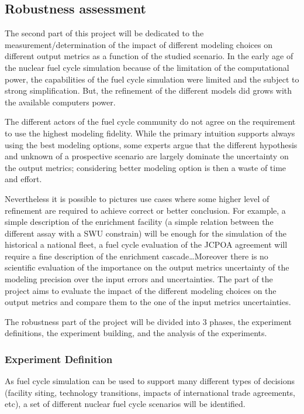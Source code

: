 
\subsection{Robustness assessment}

The second part of this project will be dedicated to the
measurement/determination of the impact of different modeling choices on
different output metrics as a function of the studied scenario.  In the early
age of the nuclear fuel cycle simulation because of the limitation of the
computational power, the capabilities of the fuel cycle simulation were limited
and the subject to strong simplification. But, the refinement of the different
models did grows with the available computers power. 

The different actors of the fuel cycle community do not agree on the requirement
to use the highest modeling fidelity. While the primary intuition supports
always using the best modeling options, some experts argue that the different
hypothesis and unknown of a prospective scenario are largely dominate the
uncertainty on the output metrics; considering better modeling option is then a
waste of time and effort.

Nevertheless it is possible to pictures use cases where some higher level of
refinement are required to achieve correct or better conclusion. For example, a
simple description of the enrichment facility (a simple relation between the
different assay with a SWU constrain) will be enough for the simulation of the
historical a national fleet, a fuel cycle evaluation of the JCPOA agreement will
require a fine description of the enrichment cascade\dots Moreover there is no
scientific evaluation of the importance on the output metrics uncertainty of the
modeling precision over the input errors and uncertainties.  The part of the
project aims to evaluate the impact of the different modeling choices on the
output metrics and compare them to the one of the input metrics uncertainties.

The robustness part of the project will be divided into 3 phases, the experiment
definitions, the experiment building, and the analysis of the experiments.


\subsubsection{Experiment Definition}

As fuel cycle simulation can be used to support many different types of
decisions (facility siting, technology transitions, impacts of international
trade agreements, etc), a set of different nuclear fuel cycle scenarios will be
identified.

